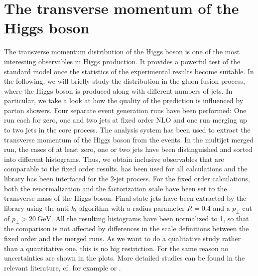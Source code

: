 \section{The transverse momentum of the Higgs boson}
\label{sec:higgs_pt}
The transverse momentum distribution of the Higgs boson is one of the most interesting observables in Higgs production.
It provides a powerful test of the standard model once the statistics of the experimental results become suitable.
In the following, we will briefly study the distribution in the gluon fusion process, where the Higgs boson is produced along with different numbers of jets.
In particular, we take a look at how the quality of the prediction is influenced by parton showers.
Four separate event generation runs have been performed: One run each for zero, one and two jets at fixed order NLO and one \mcatnlo{} run merging up to two jets in the core process.
The \rivet{} analysis system has been used to extract the transverse momentum of the Higgs boson from the events.
In the multijet merged run, the cases of at least zero, one or two jets have been distinguished and sorted into different histograms.
Thus, we obtain inclusive observables that are comparable to the fixed order results.
\sherpa{} has been used for all calculations and the \mcfm{} library \cite{mcfm_hjj} has been interfaced for the 2-jet process.
For the fixed order calculations, both the renormalization and the factorization scale have been set to the transverse mass of the Higgs boson.
Final state jets have been extracted by the \fastjet{} library \cite{fastjet_manual} using the anti-$k_t$ algorithm \cite{anti_kt} with a radius parameter $R=0.4$ and a $p_\perp$-cut of $p_\perp > \SI{20}{\giga\electronvolt}$.
All the resulting histograms have been normalized to \num{1}, so that the comparison is not affected by differences in the scale definitions between the fixed order and the merged runs.
As we want to do a qualitative study rather than a quantitative one, this is no big restriction.
For the same reason no uncertainties are shown in the plots.
More detailed studies can be found in the relevant literature, cf. for example \cite{symmetrybreaking1,symmetrybreaking2} or \cite{higgshandbook1,higgshandbook2,higgshandbook3}.

